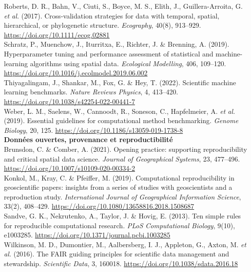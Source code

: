 \documentclass[11pt,a4paper]{article}
\begin{document}
{Roberts, D. R., Bahn, V., Ciuti, S., Boyce, M. S., Elith, J., Guillera-Arroita, G. \textit{et al.} (2017). Cross-validation strategies for data with temporal, spatial, hierarchical, or phylogenetic structure. \textit{Ecography}, 40(8), 913--929. \url{https://doi.org/10.1111/ecog.02881}\\[0.2cm]

Schratz, P., Muenchow, J., Iturritxa, E., Richter, J. \& Brenning, A. (2019). Hyperparameter tuning and performance assessment of statistical and machine-learning algorithms using spatial data. \textit{Ecological Modelling}, 406, 109--120. \url{https://doi.org/10.1016/j.ecolmodel.2019.06.002}\\[0.2cm]

Thiyagalingam, J., Shankar, M., Fox, G. \& Hey, T. (2022). Scientific machine learning benchmarks. \textit{Nature Reviews Physics}, 4, 413--420. \url{https://doi.org/10.1038/s42254-022-00441-7}\\[0.2cm]

Weber, L. M., Saelens, W., Cannoodt, R., Soneson, C., Hapfelmeier, A. \textit{et al.} (2019). Essential guidelines for computational method benchmarking. \textit{Genome Biology}, 20, 125. \url{https://doi.org/10.1186/s13059-019-1738-8}\\[0.4cm]

\textbf{Données ouvertes, provenance et reproductibilité}\\[0.15cm]

Brunsdon, C. \& Comber, A. (2021). Opening practice: supporting reproducibility and critical spatial data science. \textit{Journal of Geographical Systems}, 23, 477--496. \url{https://doi.org/10.1007/s10109-020-00334-2}\\[0.2cm]

Konkol, M., Kray, C. \& Pfeiffer, M. (2019). Computational reproducibility in geoscientific papers: insights from a series of studies with geoscientists and a reproduction study. \textit{International Journal of Geographical Information Science}, 33(2), 408--429. \url{https://doi.org/10.1080/13658816.2018.1508687}\\[0.2cm]

Sandve, G. K., Nekrutenko, A., Taylor, J. \& Hovig, E. (2013). Ten simple rules for reproducible computational research. \textit{PLoS Computational Biology}, 9(10), e1003285. \url{https://doi.org/10.1371/journal.pcbi.1003285}\\[0.2cm]

Wilkinson, M. D., Dumontier, M., Aalbersberg, I. J., Appleton, G., Axton, M. \textit{et al.} (2016). The FAIR guiding principles for scientific data management and stewardship. \textit{Scientific Data}, 3, 160018. \url{https://doi.org/10.1038/sdata.2016.18}\\[0.4cm]

}
\end{document}
